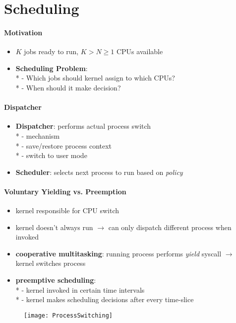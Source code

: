 \section{Scheduling}

\paragraph{Motivation}
\begin{itemize}
  \item \( K \) jobs ready to run, \( K > N \geq 1 \) CPUs available
  \item \textbf{Scheduling Problem}: \\*
    - Which jobs should kernel assign to which CPUs? \\*
    - When should it make decision?
\end{itemize}

\paragraph{Dispatcher}
\begin{itemize}
  \item \textbf{Dispatcher}: performs actual process switch \\*
    - mechanism \\*
    - save/restore process context \\*
    - switch to user mode
  \item \textbf{Scheduler}: selects next process to run based on \emph{policy}
\end{itemize}

\paragraph{Voluntary Yielding vs. Preemption}
\begin{itemize}
  \item kernel responsible for CPU switch
  \item kernel doesn't always run \( \to \) can only dispatch different process when invoked
  \item \textbf{cooperative multitasking}: running process performs \emph{yield} syscall \( \to \) kernel switches process
  \item \textbf{preemptive scheduling}: \\*
    - kernel invoked in certain time intervals \\*
    - kernel makes scheduling decisions after every time-slice
\end{itemize}
\begin{figure}[h]\centering\label{ProcessSwitching}\texttt{[image: ProcessSwitching]}\end{figure}


